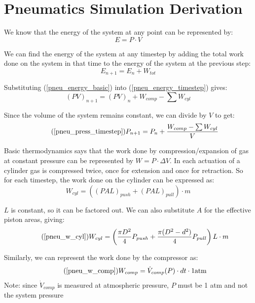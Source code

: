 \documentclass[11pt,a4paper,titlepage]{article}
\begin{document}
	\newpage
	\section{Pneumatics Simulation Derivation} \label{appendixE}
	We know that the energy of the system at any point can be represented by:
	\begin{equation} \label{pneu_energy_basic}
		E = P \cdot V
	\end{equation}
	
	We can find the energy of the system at any timestep by adding the total work done on the system in that time to the energy of the system at the previous step:
	\begin{equation} \label{pneu_energy_timestep}
		E_{n+1} = E_n + W_{tot}
	\end{equation}
	
	Substituting (\ref{pneu_energy_basic}) into (\ref{pneu_energy_timestep}) gives:
	\begin{equation}
		(PV)_{n+1} = (PV)_n + W_{comp} - \sum W_{cyl}
	\end{equation}
	
	Since the volume of the system remains constant, we can divide by $V$ to get:
	\begin{equation} \tag{\ref*{pneu_press_timestep}}
		P_{n+1} = P_n + \frac{W_{comp} - \sum W_{cyl}}{V}
	\end{equation}
	
	Basic thermodynamics says that the work done by compression/expansion of gas at constant pressure can be represented by $W = P \cdot \Delta V$. In each actuation of a cylinder gas is compressed twice, once for extension and once for retraction. So for each timestep, the work done on the cylinder can be expressed as:
	\begin{equation}
		W_{cyl} = ((PAL)_{push} + (PAL)_{pull}) \cdot m
	\end{equation}
	
	$L$ is constant, so it can be factored out. We can also substitute $A$ for the effective piston areas, giving:
	\begin{equation} \tag{\ref*{pneu_w_cyl}}
		W_{cyl} = \left( \frac{\pi D^2}{4} P_{push} + \frac{\pi (D^2 - d^2)}{4} P_{pull} \right) L \cdot m
	\end{equation}
	
	Similarly, we can represent the work done by the compressor as:
	\begin{equation} \tag{\ref*{pneu_w_comp}}
		W_{comp} = \dot{V}_{comp}(P) \cdot dt \cdot 1 \text{atm}
	\end{equation}
	Note: since $\dot{V}_{comp}$ is measured at atmospheric pressure, $P$ must be 1 atm and not the system pressure
	
\end{document}
